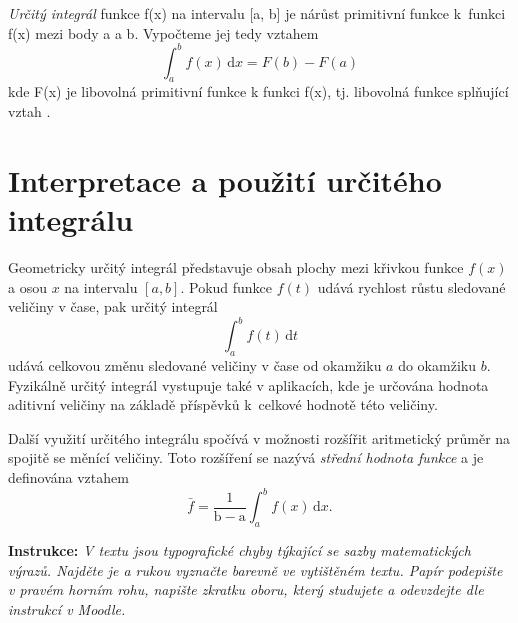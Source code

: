 \documentclass[11pt, reqno]{amsart}
\begin{document}
{\itshape Určitý integrál} funkce f(x) na intervalu [a, b] je nárůst primitivní funkce 
k~funkci f(x) mezi body a a b. Vypočteme jej tedy vztahem
\[\int_a^b f(x) \,\mathrm dx = F(b) - F(a)\tag{2}\] kde F(x) je libovolná primitivní funkce k funkci f(x), tj. libovolná funkce splňující vztah .

\section*{Interpretace a použití určitého integrálu}

Geometricky určitý integrál  představuje obsah plochy mezi křivkou funkce $f(x)$ a osou $x$ na intervalu $[a, b]$. Pokud funkce $f(t)$ udává rychlost růstu sledované veličiny v čase, pak určitý integrál 
\[\int_a^b f(t) \,\mathrm dt\]
\hspace*{\parindent}udává celkovou změnu sledované veličiny v čase od okamžiku $a$ do okamžiku $b$. 
Fyzikálně určitý integrál vystupuje také v aplikacích, kde 
je určována hodnota aditivní veličiny na základě příspěvků k~celkové hodnotě této veličiny.

Další využití určitého integrálu spočívá v možnosti rozšířit aritmetický průměr na 
spojitě se měnící veličiny. Toto rozšíření se nazývá 
\emph{střední hodnota funkce} a je definována vztahem
\[\bar{f} = \frac{1}{\mathrm b-\mathrm a} \int_a^b f(x) \,\mathrm dx.\]




\vfill
{\bfseries Instrukce:} \itshape V textu jsou typografické chyby týkající se sazby matematických výrazů. 
Najděte je a rukou vyznačte barevně ve vytištěném textu. Papír podepište v pravém horním rohu, napište zkratku 
oboru, který studujete
a odevzdejte dle instrukcí v Moodle. 
\end{document}
